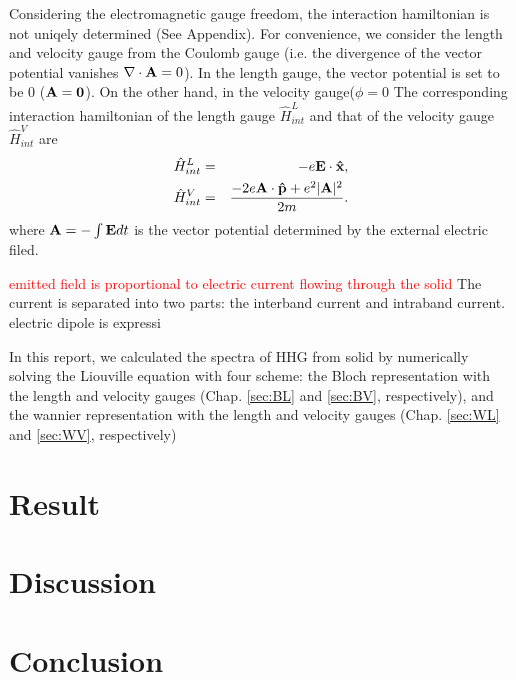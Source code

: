 \documentclass[aps,prb,preprint]{revtex4-1}
\begin{document}
Considering the electromagnetic gauge freedom, the interaction hamiltonian is not uniqely determined (See Appendix). For convenience, we consider the length and velocity gauge from the Coulomb gauge (i.e. the divergence of the vector potential vanishes $\nabla \cdot {\bf A} = 0$). In the length gauge, the vector potential is set to be 0 (${\bf A} = {\bf 0}$). On the other hand, in the velocity gauge($\phi = 0$
The corresponding interaction hamiltonian of the length gauge  $\hat{H}^{L}_{int}$ and that of the velocity gauge $\hat{H}^{V}_{int}$ are 
 \begin{eqnarray}
 \hat{H}^{L}_{int} &=&  -e{\bf E} \cdot {\bf \hat{x}}, \\
 \hat{H}^{V}_{int} &=& \frac{- 2e{\bf A} \cdot {\bf \hat{p}} + e^2 |{\bf A}|^2}{2m}. 
\end{eqnarray}
where ${\bf A} = - \int {\bf E} dt$ is the vector potential determined by the external electric filed. 

\textcolor{red}{emitted field is proportional to electric current flowing through the solid}
The current is separated into two parts: the interband current and intraband current.\cite{Foldi}
electric dipole is expressi

In this report, we calculated the spectra of HHG from solid by numerically solving the Liouville equation with four scheme: the Bloch representation with the length and velocity gauges (Chap. \ref{sec:BL} and \ref{sec:BV}, respectively), and the wannier representation with the length and velocity gauges (Chap. \ref{sec:WL} and \ref{sec:WV}, respectively)

\section{Result}

\section{Discussion}

\section{Conclusion}

\newpage
\end{document}
